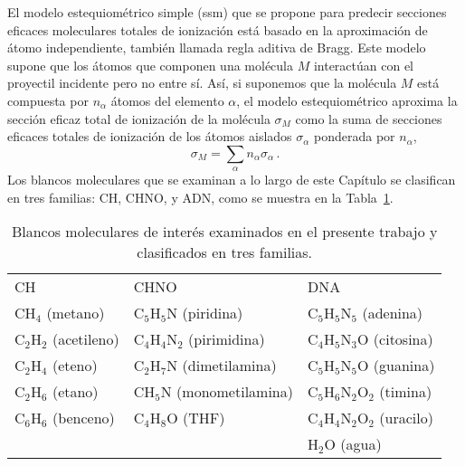 El modelo estequiométrico simple (\acs{ssm}) que se propone para 
predecir secciones eficaces moleculares totales de ionización está 
basado en la aproximación de átomo independiente, también llamada regla 
aditiva de Bragg. Este modelo supone que los átomos que componen una 
molécula $M$ interactúan con el proyectil incidente pero no entre sí. 
Así, si suponemos que la molécula $M$ está compuesta por $n_{\alpha}$ 
átomos del elemento $\alpha$, el modelo estequiométrico aproxima la 
sección eficaz total de ionización de la molécula $\sigma_M$ como la 
suma de secciones eficaces totales de ionización de los átomos aislados 
$\sigma_{\alpha}$ ponderada por $n_{\alpha}$, 
\begin{equation}
\sigma_{M}=\sum\limits_{\alpha}n_{\alpha}\sigma_{\alpha}\,.  
\label{eq:sumion}
\end{equation}
Los blancos moleculares que se examinan a lo largo de este Capítulo se 
clasifican en tres familias: CH, CHNO, y ADN, como se muestra en la 
Tabla~\ref{tab:families}.

\begin{table}
\begin{center}
\begin{tabularx}{\textwidth}{
>{\centering\arraybackslash}p{}
>{\centering\arraybackslash}p{}
>{\centering\arraybackslash}p{}}
\rowcolor{mydarkgray} 
CH & CHNO & DNA \\
CH$_4$ (metano) & C$_5$H$_5$N (piridina)       & C$_5$H$_5$N$_5$ (adenina) \\
\rowcolor{mygray} 
C$_2$H$_2$ (acetileno) & C$_4$H$_4$N$_2$ (pirimidina)     & C$_4$H$_5$N$_3$O (citosina) \\
C$_2$H$_4$ (eteno)     & C$_2$H$_7$N     (dimetilamina)   & C$_5$H$_5$N$_5$O (guanina) \\
\rowcolor{mygray} 
C$_2$H$_6$ (etano)     & CH$_5$N         (monometilamina) & C$_5$H$_6$N$_2$O$_2$ (timina) \\
C$_6$H$_6$ (benceno)   & C$_4$H$_8$O     (THF)            & C$_4$H$_4$N$_2$O$_2$ (uracilo) \\
\rowcolor{mygray} 
 & & H$_2$O (agua) \\
\end{tabularx}
\caption[Blancos moleculares examinados y clasificados en tres 
familias.]
{Blancos moleculares de interés examinados en el presente trabajo y 
clasificados en tres familias.}
\label{tab:families}
\end{center}
\end{table}

